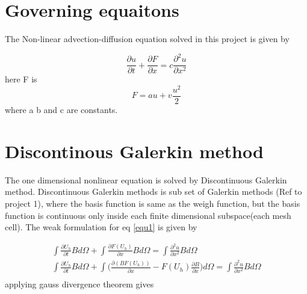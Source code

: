 \documentclass[12pt]{elsarticle}
\begin{document}
\section{Governing equaitons}
The Non-linear advection-diffusion equation solved in this project is given by

\begin{equation}\label{equ1}
\frac{\partial u}{\partial t}+\frac{\partial F}{\partial x}=c\frac{\partial^2 u}{\partial x^2}
\end{equation}
here F is
\begin{equation}
F=au+v\frac{u^2}{2}
\end{equation}
where a b and c are constants.
\newline

\section{Discontinous Galerkin method}
The one dimensional nonlinear equation is solved by Discontinuous Galerkin method. Discontinuous Galerkin methods is sub set of Galerkin methods (Ref to project 1), where the basis function is same as the weigh function, but the basis function is continuous only inside each finite dimensional subspace(each mesh cell). The weak formulation for eq \ref{equ1} is given by

\begin{equation}
\begin{gathered}
\int \frac{\partial U_h}{\partial t} B d\Omega + \int \frac{\partial F(U_h)}{\partial x}B d\Omega=\int \frac{\partial^2 u}{\partial x^2} B d \Omega \\
\int \frac{\partial U_h}{\partial t} B d\Omega + \int \Big( \frac{\partial (BF(U_h))}{\partial x}-F(U_h)\frac{\partial B}{\partial x} \Big) d\Omega=\int \frac{\partial^2 u}{\partial x^2} B d \Omega\\
\end{gathered}
\end{equation} 
applying gauss divergence theorem gives
\end{document}
